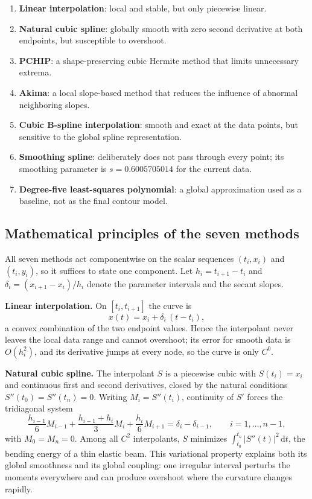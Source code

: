\documentclass[a4paper,11pt]{article}
\begin{document}
\begin{enumerate}
\item \textbf{Linear interpolation}: local and stable, but only piecewise linear.
\item \textbf{Natural cubic spline}: globally smooth with zero second derivative
  at both endpoints, but susceptible to overshoot.
\item \textbf{PCHIP}: a shape-preserving cubic Hermite method that limits
  unnecessary extrema.
\item \textbf{Akima}: a local slope-based method that reduces the influence of
  abnormal neighboring slopes.
\item \textbf{Cubic B-spline interpolation}: smooth and exact at the data points,
  but sensitive to the global spline representation.
\item \textbf{Smoothing spline}: deliberately does not pass through every point;
  its smoothing parameter is $s=0.6005705014$ for the current data.
\item \textbf{Degree-five least-squares polynomial}: a global approximation used
  as a baseline, not as the final contour model.
\end{enumerate}

\subsection{Mathematical principles of the seven methods}

All seven methods act componentwise on the scalar sequences $(t_i,x_i)$ and
$(t_i,y_i)$, so it suffices to state one component.  Let
$h_i=t_{i+1}-t_i$ and $\delta_i=(x_{i+1}-x_i)/h_i$ denote the parameter
intervals and the secant slopes.

\textbf{Linear interpolation.}  On $[t_i,t_{i+1}]$ the curve is
\[
x(t)=x_i+\delta_i\,(t-t_i),
\]
a convex combination of the two endpoint values.  Hence the interpolant never
leaves the local data range and cannot overshoot; its error for smooth data is
$O(h_i^2)$, and its derivative jumps at every node, so the curve is only $C^0$.

\textbf{Natural cubic spline.}  The interpolant $S$ is a piecewise cubic with
$S(t_i)=x_i$ and continuous first and second derivatives, closed by the natural
conditions $S''(t_0)=S''(t_n)=0$.  Writing $M_i=S''(t_i)$, continuity of $S'$
forces the tridiagonal system
\[
\frac{h_{i-1}}{6}M_{i-1}+\frac{h_{i-1}+h_i}{3}M_i+\frac{h_i}{6}M_{i+1}
=\delta_i-\delta_{i-1},\qquad i=1,\dots,n-1,
\]
with $M_0=M_n=0$.  Among all $C^2$ interpolants, $S$ minimizes
$\int_{t_0}^{t_n}|S''(t)|^2\,\mathrm dt$, the bending energy of a thin elastic
beam.  This variational property explains both its global smoothness and its
global coupling: one irregular interval perturbs the moments everywhere and can
produce overshoot where the curvature changes rapidly.
\end{document}

